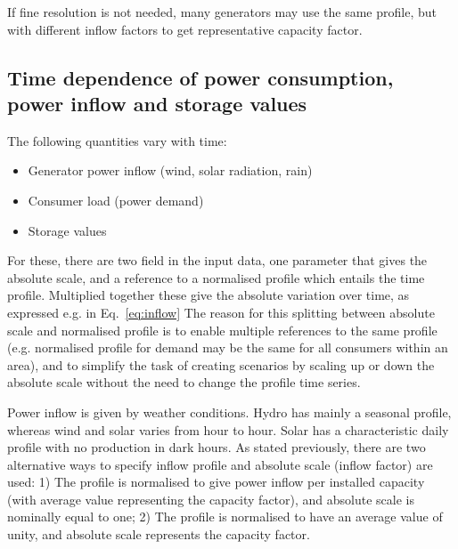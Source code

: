 \documentclass{article}
\begin{document}
If fine resolution is not needed, many generators may use the same profile, but with different inflow factors to get representative capacity factor.

\subsection{Time dependence of power consumption, power inflow and storage values}
The following quantities vary with time:
\begin{itemize}
\item Generator power inflow (wind, solar radiation, rain)
\item Consumer load (power demand)
\item Storage values
\end{itemize}

For these, there are two field in the input data, one parameter that gives the absolute scale, and a reference to a normalised profile which entails the time profile. Multiplied together these give the absolute variation over time, as expressed e.g.  in Eq.~\eqref{eq:inflow}
%
The reason for this splitting between absolute scale and normalised profile is to enable multiple references to the same profile (e.g. normalised profile for demand may be the same for all consumers within an area), and to simplify the task of creating scenarios by scaling up or down the absolute scale without the need to change the profile time series.

Power inflow is given by weather conditions. Hydro has mainly a seasonal profile, whereas wind and solar varies from hour to hour. Solar has a characteristic daily profile with no production in dark hours. 
As stated previously, there are two alternative ways to specify inflow profile and absolute scale (inflow factor) are used: 
1) The profile is normalised to give power inflow per installed capacity (with average value representing the capacity factor), and absolute scale is nominally equal to one; 
2) The profile is normalised to have an average value of unity, and absolute scale represents the capacity factor.
\end{document}
